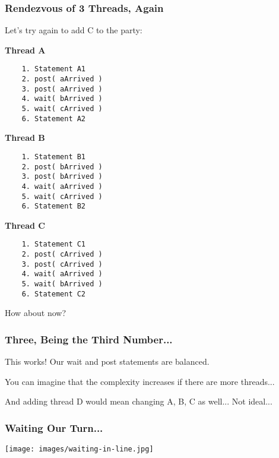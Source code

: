 \begin{frame}[fragile]
	\frametitle{Rendezvous of 3 Threads, Again}

	Let's try again to add C to the party:

	\begin{multicols}{3}
		\textbf{Thread A}
		\begin{verbatim}
	1. Statement A1
	2. post( aArrived )
	3. post( aArrived )
	4. wait( bArrived )
	5. wait( cArrived )
	6. Statement A2
  \end{verbatim}
		\columnbreak
		\textbf{Thread B}
		\begin{verbatim}
	1. Statement B1
	2. post( bArrived )
	3. post( bArrived )
	4. wait( aArrived )
	5. wait( cArrived )
	6. Statement B2
  \end{verbatim}
  		\columnbreak
		\textbf{Thread C}\vspace{-2em}
		\begin{verbatim}
	1. Statement C1
	2. post( cArrived )
	3. post( cArrived )
	4. wait( aArrived )
	5. wait( bArrived )
	6. Statement C2
  \end{verbatim}
	\end{multicols}
	\vspace{-2em}

How about now?

\end{frame}


\begin{frame}
\frametitle{Three, Being the Third Number...}

This works! Our wait and post statements are balanced.

You can imagine that the complexity increases if there are more threads... 

And adding thread D would mean changing A, B, C as well... Not ideal...

\end{frame}


\begin{frame}
	\frametitle{Waiting Our Turn...}

	\begin{center}
		\texttt{[image: images/waiting-in-line.jpg]}
	\end{center}

\end{frame}


